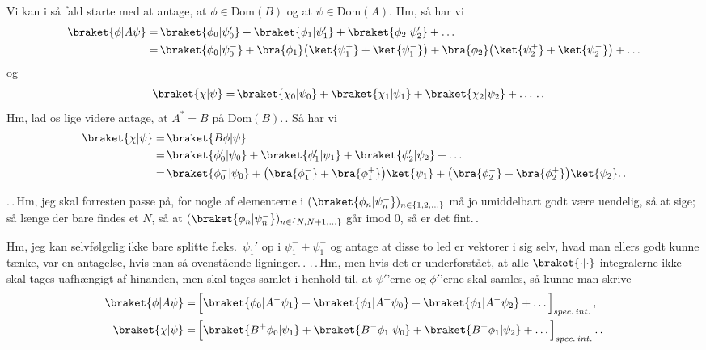 \documentclass{report}
\begin{document}
Vi kan i så fald starte med at antage, at $\phi\in\mathrm{Dom}(B)$ og at $\psi\in\mathrm{Dom}(A)$. Hm, så har vi
\begin{align}
\begin{aligned}
	\braket{\phi| A \psi} =&\,
			\braket{\phi_0 | \psi_0'} + \braket{\phi_1 | \psi_1'} + \braket{\phi_2 | \psi_2'} + \ldots \\
		=&\, 
			\braket{\phi_0| \psi_0^-} + \bra{\phi_1} \big(\ket{\psi_1^+} + \ket{\psi_1^-}\big) + \bra{\phi_2}\big(\ket{\psi_2^+} + \ket{\psi_2^-}\big) + \ldots \\
\end{aligned}
\end{align}
og
\begin{align}
\begin{aligned}
	\braket{\chi| \psi} =&\,
	\braket{\chi_0 | \psi_0} + \braket{\chi_1 | \psi_1} + \braket{\chi_2 | \psi_2} + \ldots\,.\,.
\end{aligned}
\end{align}
Hm, lad os lige videre antage, at $A^*=B$ på Dom$(B)$.\,. Så har vi
\begin{align}
\begin{aligned}
	\braket{\chi| \psi} =&\, \braket{B \phi| \psi} \\
		=&\, 
			\braket{\phi_0' | \psi_0} 
				+ \braket{\phi_1' | \psi_1} 
				+ \braket{\phi_2' | \psi_2} + \ldots \\
		=&\, 
			\braket{\phi_0^- | \psi_0} 
				+ \big(\bra{\phi_1^-} + \bra{\phi_1^+}\big)\ket{\psi_1} 
				+ \big(\bra{\phi_2^-} + \bra{\phi_2^+}\big)\ket{\psi_2}.\,.
\end{aligned}
\end{align}

.\,.\,Hm, jeg skal forresten passe på, for nogle af elementerne i $(\braket{\phi_n| \psi_n^-})_{n\in{\{1,2,\ldots\}}}$ må jo umiddelbart godt være uendelig, så at sige; så længe der bare findes et $N$, så at $(\braket{\phi_n| \psi_n^-})_{n\in{\{N,N+1,\ldots\}}}$ går imod 0, så er det fint.\,. 

Hm, jeg kan selvfølgelig ikke bare splitte f.eks.\ $\psi_1'$ op i $\psi_1^- + \psi_1^+$ og antage at disse to led er vektorer i sig selv, hvad man ellers godt kunne tænke, var en antagelse, hvis man så ovenstående ligninger.\,. 
.\,.\,Hm, men hvis det er underforstået, at alle $\braket{\cdot|\cdot}$-integralerne ikke skal tages uafhængigt af hinanden, men skal tages samlet i henhold til, at $\psi'$'erne og $\phi'$'erne skal samles, så kunne man skrive
\begin{align}
\begin{aligned}
	\braket{\phi| A \psi} = &\,
		\Big[
			\braket{\phi_0 | A^- \psi_1} 
				+ \braket{\phi_1 | A^+ \psi_0} 
				+ \braket{\phi_1 | A^- \psi_2} 
				+ \ldots
		\Big]_{spec.\: int.}\,,\\
	\braket{\chi| \psi} = &\,
		\Big[
			\braket{B^+ \phi_0 | \psi_1} 
				+ \braket{B^- \phi_1 | \psi_0} 
				+ \braket{B^+ \phi_1 | \psi_2} 
				+ \ldots
		\Big]_{spec.\: int.}\,.\,.
\end{aligned}
\end{align}
\end{document}
